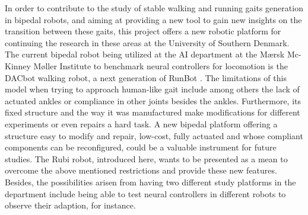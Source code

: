 In order to contribute to the study of stable walking and running gaits generation in bipedal robots, and aiming at providing a new tool to gain new insights on the transition between these gaits, this project offers a new robotic platform for continuing the research in these areas at the University of Southern Denmark.
The current bipedal robot being utilized at the AI department at the Mærsk Mc-Kinney Møller Institute to benchmark neural controllers for locomotion is the DACbot walking robot, a next generation of RunBot \cite{runbot1} \cite{runbot2}.
The limitations of this model when trying to approach human-like gait include among others the lack of actuated ankles or compliance in other joints besides the ankles. 
Furthermore, its fixed structure and the way it was manufactured make modifications for different experiments or even repairs a hard task.
A new bipedal platform offering a structure easy to modify and repair, low-cost, fully actuated and whose compliant components can be reconfigured, could be a valuable instrument for future studies.
The Rubi robot, introduced here, wants to be presented as a mean to overcome the above mentioned restrictions and provide these new features. 
Besides, the possibilities arisen from having two different study platforms in the department include being able to test neural controllers in different robots to observe their adaption, for instance.
